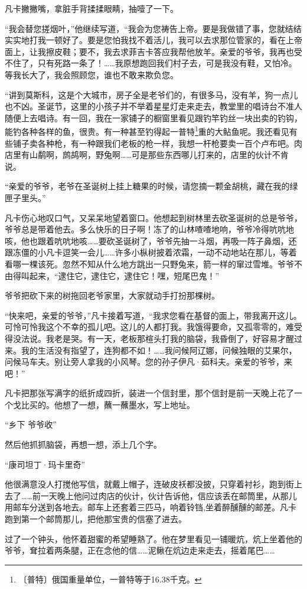 \documentclass[12pt,UTF-8,openany]{ctexbook}
\begin{document}
\begin{large}
    凡卡撇撇嘴，拿脏手背揉揉眼睛，抽噎了一下。
    
    “我会替您搓烟叶，”他继续写道，“我会为您祷告上帝。要是我做错了事，您就结结实实地打我一顿好了。要是您怕我找不着活儿，我可以去求那位管家的，看在上帝面上，让我擦皮鞋；要不，我去求菲吉卡答应我帮他放羊。亲爱的爷爷，我再也受不住了，只有死路一条了！……我原想跑回我们村子去，可是我没有鞋，又怕冷。等我长大了，我会照顾您，谁也不敢来欺负您。
    
    “讲到莫斯科，这是个大城市，房子全是老爷们的，有很多马，没有羊，狗一点儿也不凶。圣诞节，这里的小孩子并不举着星星灯走来走去，教堂里的唱诗台不准人随便上去唱诗。有一回，我在一家铺子的橱窗里看见跟钓竿钓丝一块出卖的钓钩，能钓各种各样的鱼，很贵。有一种甚至钓得起一普特\footnote{〔普特〕俄国重量单位，一普特等于16.38千克。}重的大鲇鱼呢。我还看见有些铺子卖各种枪，有一种跟我们老板的枪一样，我想一杆枪要卖一百个卢布吧。肉店里有山鹬啊，鹧鸪啊，野兔啊……可是那些东西哪儿打来的，店里的伙计不肯说。
    
    “亲爱的爷爷，老爷在圣诞树上挂上糖果的时候，请您摘一颗金胡桃，藏在我的绿匣子里头。”
    
    凡卡伤心地叹口气，又呆呆地望着窗口。他想起到树林里去砍圣诞树的总是爷爷，爷爷总是带着他去。多么快乐的日子啊！冻了的山林喳喳地响，爷爷冷得吭吭地咳，他也跟着吭吭地咳……要砍圣诞树了，爷爷先抽一斗烟，再吸一阵子鼻烟，还跟冻僵的小凡卡逗笑一会儿……许多小枞树披着浓霜，一动不动地站在那儿，等着看哪一棵该死。忽然不知从什么地方跳出一只野兔来，箭一样的窜过雪堆。爷爷不由得叫起来，“逮住它，逮住它，逮住它！嘿，短尾巴鬼！”
    
    爷爷把砍下来的树拖回老爷家里，大家就动手打扮那棵树。
    
    “快来吧，亲爱的爷爷，”凡卡接着写道，“我求您看在基督的面上，带我离开这儿。可怜可怜我这个不幸的孤儿吧。这儿的人都打我。我饿得要命，又孤零零的，难受得没法说。我老是哭。有一天，老板那楦头打我的脑袋，我昏倒了，好容易才醒过来。我的生活没有指望了，连狗都不如！……我问候阿辽娜，问候独眼的艾果尔，问候马车夫。别让旁人拿我的小风琴。您的孙子伊凡·茹科夫。亲爱的爷爷，来吧！”
    
    凡卡把那张写满字的纸折成四折，装进一个信封里，那个信封是前一天晚上花了一个戈比买的。他想了一想，蘸一蘸墨水，写上地址。
    
    “乡下 爷爷收”
    
    然后他抓抓脑袋，再想一想，添上几个字。
    
    “康司坦丁·玛卡里奇”
    
    他很满意没人打搅他写信，就戴上帽子，连破皮袄都没披，只穿着衬衫，跑到街上去了……前一天晚上他问过肉店的伙计，伙计告诉他，信应该丢在邮筒里，从那儿用邮车分送到各地去。邮车上还套着三匹马，响着铃铛,坐着醉醺醺的邮差。凡卡跑到第一个邮筒那儿，把他那宝贵的信塞了进去。
    
    过了一个钟头，他怀着甜蜜的希望睡熟了。他在梦里看见一铺暖炕，炕上坐着他的爷爷，耷拉着两条腿，正在念他的信……泥鳅在炕边走来走去，摇着尾巴……
    
\end{large}
\end{document}
